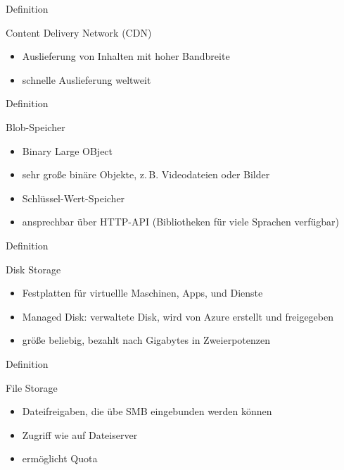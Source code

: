 \documentclass{scrartcl}
\newenvironment{flashcard}[2][]{%
    #1
    \vfill
    \centerline{\Large{#2}}
    \vfill
\newpage
}
{\newpage}
\begin{document}
    \begin{flashcard}[Definition]{Content Delivery Network (CDN)}
        \begin{itemize}
            \item Auslieferung von Inhalten mit hoher Bandbreite
            \item schnelle Auslieferung weltweit
        \end{itemize}
    \end{flashcard}

    \begin{flashcard}[Definition]{Blob-Speicher}
        \begin{itemize}
            \item Binary Large OBject
            \item sehr große binäre Objekte, z.\,B. Videodateien oder Bilder
            \item Schlüssel-Wert-Speicher
            \item ansprechbar über HTTP-API (Bibliotheken für viele Sprachen verfügbar)
        \end{itemize}

    \end{flashcard}

    \begin{flashcard}[Definition]{Disk Storage}
        \begin{itemize}
            \item Festplatten für virtuellle Maschinen, Apps, und Dienste
            \item Managed Disk: verwaltete Disk, wird von Azure erstellt und freigegeben
            \item größe beliebig, bezahlt nach Gigabytes in Zweierpotenzen
        \end{itemize}
    \end{flashcard}

    \begin{flashcard}[Definition]{File Storage}
        \begin{itemize}
            \item Dateifreigaben, die übe SMB eingebunden werden können
            \item Zugriff wie auf Dateiserver
            \item ermöglicht Quota
        \end{itemize}
    \end{flashcard}
\end{document}
